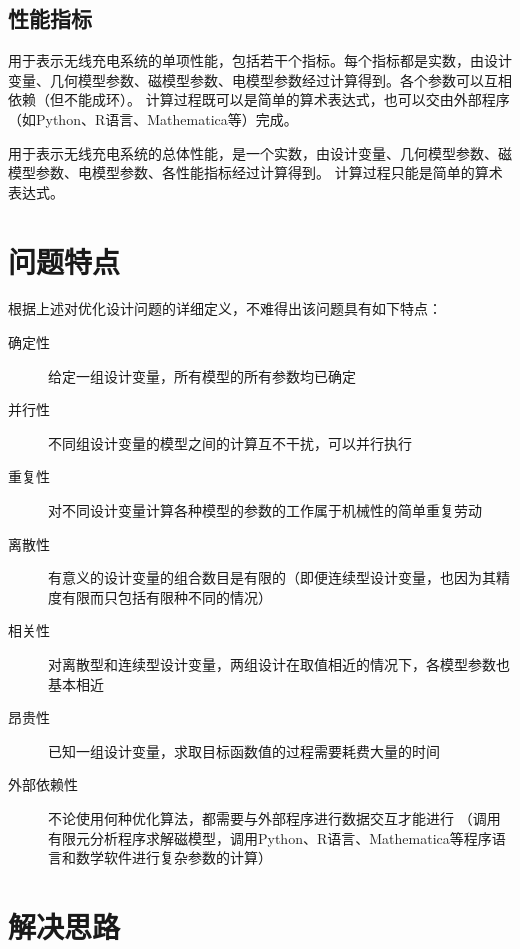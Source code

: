 \documentclass[index]{subfiles}
\begin{document}
\subsection{性能指标}
\begin{definition}[性能指标]
  用于表示无线充电系统的单项性能，包括若干个指标。每个指标都是实数，由设计变量、几何模型参数、磁模型参数、电模型参数经过计算得到。各个参数可以互相依赖（但不能成环）。
  计算过程既可以是简单的算术表达式，也可以交由外部程序（如Python、R语言、Mathematica等）完成。
\end{definition}
\begin{definition}[总体性能指标]
  用于表示无线充电系统的总体性能，是一个实数，由设计变量、几何模型参数、磁模型参数、电模型参数、各性能指标经过计算得到。
  计算过程只能是简单的算术表达式。
\end{definition}

\section{问题特点}\label{sec:fea-fea}
根据上述对优化设计问题的详细定义，不难得出该问题具有如下特点：
\begin{description}
  \item[确定性] 给定一组设计变量，所有模型的所有参数均已确定
  \item[并行性] 不同组设计变量的模型之间的计算互不干扰，可以并行执行
  \item[重复性] 对不同设计变量计算各种模型的参数的工作属于机械性的简单重复劳动
  \item[离散性] 有意义的设计变量的组合数目是有限的（即便连续型设计变量，也因为其精度有限而只包括有限种不同的情况）
  \item[相关性] 对离散型和连续型设计变量，两组设计在取值相近的情况下，各模型参数也基本相近
  \item[昂贵性] 已知一组设计变量，求取目标函数值的过程需要耗费大量的时间
  \item[外部依赖性] 不论使用何种优化算法，都需要与外部程序进行数据交互才能进行
    （调用有限元分析程序求解磁模型，调用Python、R语言、Mathematica等程序语言和数学软件进行复杂参数的计算）
\end{description}

\section{解决思路}
\end{document}
